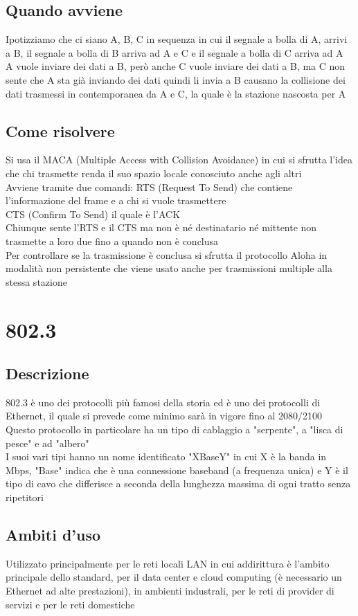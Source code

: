 \documentclass[10pt,oneside,a4paper]{article}
\begin{document}
\subsection{Quando avviene}
Ipotizziamo che ci siano A, B, C in sequenza in cui il segnale a bolla di A, arrivi a B, il segnale a bolla di B arriva ad A e C e il segnale a bolla di C arriva ad A\\
A vuole inviare dei dati a B, però anche C vuole inviare dei dati a B, ma C non sente che A sta già inviando dei dati quindi li invia a B causano la collisione dei dati trasmessi in contemporanea da A e C, la quale è la stazione nascosta per A\\
\subsection{Come risolvere}
Si usa il MACA (Multiple Access with Collision Avoidance) in cui si sfrutta l'idea che chi trasmette renda il suo spazio locale conosciuto anche agli altri\\
Avviene tramite due comandi:
RTS (Request To Send) che contiene l'informazione del frame e a chi si vuole trasmettere\\
CTS (Confirm To Send) il quale è l'ACK\\
Chiunque sente l'RTS e il CTS ma non è né destinatario né mittente non trasmette a loro due fino a quando non è conclusa\\
Per controllare se la trasmissione è conclusa si sfrutta il protocollo Aloha in modalità non persistente che viene usato anche per trasmissioni multiple alla stessa stazione
\section{802.3}
\subsection{Descrizione}
802.3 è uno dei protocolli più famosi della storia ed è uno dei protocolli di Ethernet, il quale si prevede come minimo sarà in vigore fino al 2080/2100\\
Questo protocollo in particolare ha un tipo di cablaggio a "serpente", a "lisca di pesce" e ad "albero"\\
I suoi vari tipi hanno un nome identificato "XBaseY" in cui X è la banda in Mbps, "Base" indica che è una connessione baseband (a frequenza unica) e Y è il tipo di cavo che differisce a seconda della lunghezza massima di ogni tratto senza ripetitori
\subsection{Ambiti d'uso}
Utilizzato principalmente per le reti locali LAN in cui addirittura è l'ambito principale dello standard, per il data center e cloud computing (è necessario un Ethernet ad alte prestazioni), in ambienti industrali, per le reti di provider di servizi e per le reti domestiche
\end{document}
